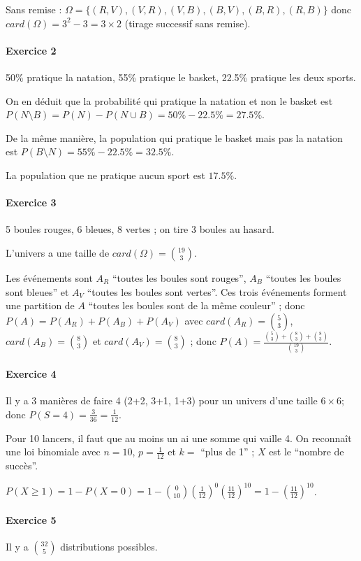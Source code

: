 \documentclass[10pt,a4paper,french]{article}
\begin{document}
Sans remise : $\Omega=\lbrace(R, V), (V, R), (V, B), (B, V), (B, R), (R, B)\rbrace$ donc $card(\Omega)=3^2-3=3 \times 2$ (tirage successif sans remise).

\paragraph{Exercice 2} 50\% pratique la natation, 55\% pratique le basket, 22.5\% pratique les deux sports.

On en déduit que la probabilité qui pratique la natation et non le basket est $P(N \setminus B) = P(N) - P(N \cup B) = 50 \% - 22.5\% = 27.5 \% $.

De la même manière, la population qui pratique le basket mais pas la natation est $P(B \setminus N)= 55\% - 22.5\% = 32.5\%$.

La population que ne pratique aucun sport est $17.5\%$.

\paragraph{Exercice 3}
5 boules rouges, 6 bleues, 8 vertes ; on tire 3 boules au hasard.

L'univers a une taille de $card(\Omega) = {19 \choose 3}$.

Les événements sont $A_R$ ``toutes les boules sont rouges'', $A_B$ ``toutes les boules sont bleues'' et $A_V$ ``toutes les boules sont vertes''.
Ces trois événements forment une partition de $A$ ``toutes les boules sont de la même couleur'' ; donc 
$P(A) = P(A_R) + P(A_B) + P(A_V)$
avec
$card(A_R)={5 \choose 3}$,
$card(A_B)={8 \choose 3}$ et
$card(A_V)={8 \choose 3}$ ; donc
$P(A)=
\frac
	{{5 \choose 3} + {8 \choose 3} + {8 \choose 3}}
	{{19 \choose 3}}
$.

\paragraph{Exercice 4}
Il y a 3 manières de faire 4 (2+2, 3+1, 1+3) pour un univers d'une taille $6\times6$; donc $P(S=4)=\frac{3}{36}=\frac{1}{12}$.

Pour 10 lancers, il faut que au moins un ai une somme qui vaille 4. On reconnaît une loi binomiale avec $n=10$, $p=\frac{1}{12}$ et $k=$ ``plus de 1'' ; $X$ est le ``nombre de succès''.

$P(X \geq 1) = 1 - P(X=0) = 1 - {0 \choose 10} (\frac{1}{12})^0 (\frac{11}{12})^{10} = 1 - (\frac{11}{12})^{10}$.

\paragraph{Exercice 5}
Il y a $32 \choose 5$ distributions possibles.
\end{document}
